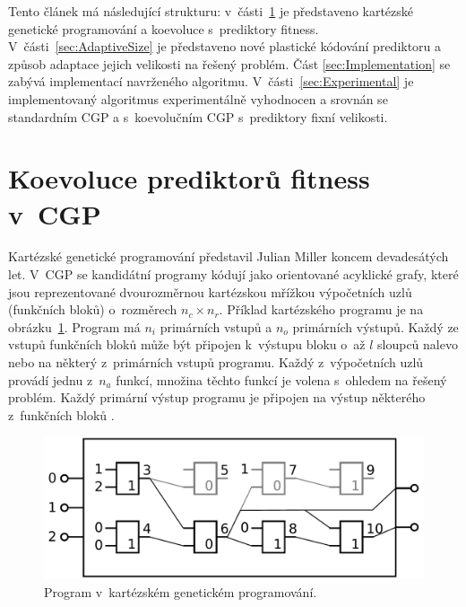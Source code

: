 \documentclass[czech]{ExcelAtFIT} %
\begin{document}
Tento článek má následující strukturu: v~části~\ref{sec:Coevolution} je představeno kartézské genetické programování a koevoluce s~prediktory fitness. V~části~\ref{sec:AdaptiveSize} je představeno nové plastické kódování prediktoru a způsob adaptace jejich velikosti na řešený problém. Část \ref{sec:Implementation} se zabývá implementací navrženého algoritmu. V~části~\ref{sec:Experimental} je implementovaný algoritmus experimentálně vyhodnocen a srovnán se standardním CGP a s~koevolučním CGP s~prediktory fixní velikosti.



\section{Koevoluce prediktorů fitness v~CGP}
\label{sec:Coevolution}

Kartézské genetické programování představil Julian Miller koncem devadesátých let. V~CGP se kandidátní programy kódují jako orientované acyklické grafy, které jsou reprezentované dvourozměrnou kartézskou mřížkou výpočetních uzlů (funkčních bloků) o~roz\-mě\-rech $n_c \times n_r$. Příklad kar\-téz\-ského programu je na obrázku~\ref{fig:CgpCircuit}. Program má $n_i$ primárních vstupů a $n_o$ primárních výstupů. Každý ze vstupů funkčních bloků může být připojen k~výstupu bloku o~až $l$ sloupců nalevo nebo na některý z~primárních vstupů programu. Každý z~výpočetních uzlů provádí jednu z~$n_a$ funkcí, množina těchto funkcí je volena s~ohledem na řešený problém. Každý primární výstup programu je připojen na výstup některého z~funkčních bloků \cite{ZelenaCGP}.

\begin{figure}[h]
    \centering\includegraphics[width=0.75\linewidth]{images/cgp.pdf}
    \caption{Program v~kartézském genetickém programování.}
    \label{fig:CgpCircuit}
\end{figure}
\end{document}
